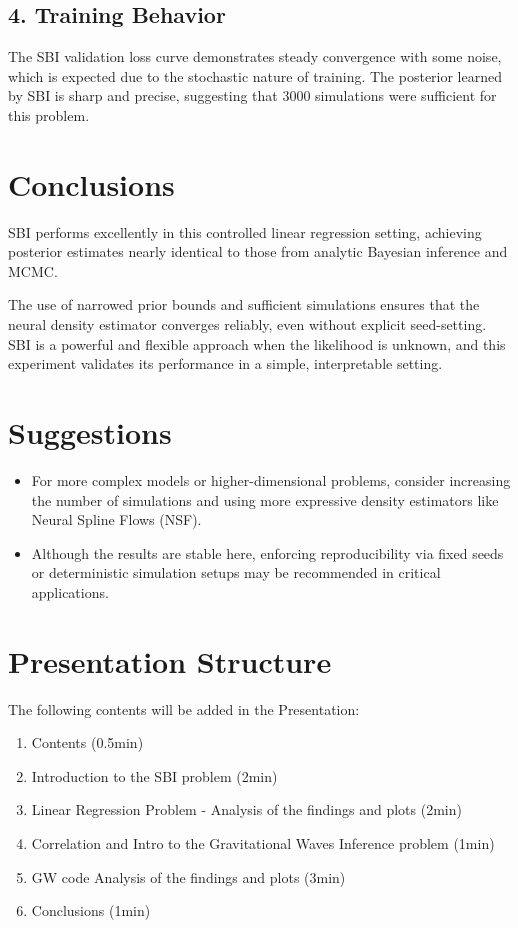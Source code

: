 \documentclass{article}
\begin{document}
\subsection*{4. Training Behavior}
The SBI validation loss curve demonstrates steady convergence with some noise, which is expected due to the stochastic nature of training. The posterior learned by SBI is sharp and precise, suggesting that 3000 simulations were sufficient for this problem.

\section*{Conclusions}
SBI performs excellently in this controlled linear regression setting, achieving posterior estimates nearly identical to those from analytic Bayesian inference and MCMC.

The use of narrowed prior bounds and sufficient simulations ensures that the neural density estimator converges reliably, even without explicit seed-setting. SBI is a powerful and flexible approach when the likelihood is unknown, and this experiment validates its performance in a simple, interpretable setting.

\section*{Suggestions}
\begin{itemize}
    \item For more complex models or higher-dimensional problems, consider increasing the number of simulations and using more expressive density estimators like Neural Spline Flows (NSF).
    \item Although the results are stable here, enforcing reproducibility via fixed seeds or deterministic simulation setups may be recommended in critical applications.
\end{itemize}

\section{Presentation Structure}
The following contents will be added in the Presentation:
\begin{enumerate}
    \item Contents (0.5min)
    \item Introduction to the SBI problem (2min)
    \item Linear Regression Problem - Analysis of the findings and plots (2min)
    \item Correlation and Intro to the Gravitational Waves Inference problem (1min)
    \item GW code Analysis of the findings and plots (3min)
    \item Conclusions (1min)
\end{enumerate}
\end{document}
